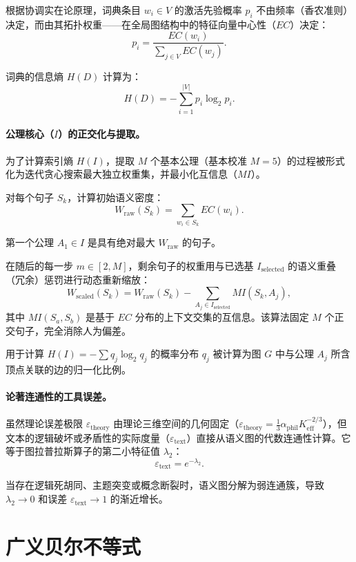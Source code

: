 \documentclass[11pt,a4paper]{article}
\begin{document}
	根据协调实在论原理，词典条目 \(w_i \in V\) 的激活先验概率 \(p_i\) 不由频率（香农准则）决定，而由其拓扑权重——在全局图结构中的特征向量中心性（\(EC\)）决定：
	\[
	p_{i} = \frac{EC(w_{i})}{\sum_{j \in V} EC(w_{j})}.
	\]
	
	词典的信息熵 \(H(D)\) 计算为：
	\[
	H(D) = -\sum_{i=1}^{|V|} p_{i} \log_{2} p_{i}.
	\]
	
	\paragraph{公理核心（\(I\)）的正交化与提取。}
	为了计算索引熵 \(H(I)\)，提取 \(M\) 个基本公理（基本校准 \(M = 5\)）的过程被形式化为迭代贪心搜索最大独立权重集，并最小化互信息（\(MI\)）。
	
	对每个句子 \(S_{k}\)，计算初始语义密度：
	\[
	W_{\text{raw}}(S_k) = \sum_{w_i \in S_k} EC(w_i).
	\]
	
	第一个公理 \(A_1 \in I\) 是具有绝对最大 \(W_{\text{raw}}\) 的句子。
	
	在随后的每一步 \(m \in [2, M]\)，剩余句子的权重用与已选基 \(I_{\text{selected}}\) 的语义重叠（冗余）惩罚进行动态重新缩放：
	\[
	W_{\text{scaled}}(S_{k}) = W_{\text{raw}}(S_{k}) - \sum_{A_{j} \in I_{\text{selected}}} MI(S_{k}, A_{j}),
	\]
	其中 \(MI(S_a, S_b)\) 是基于 \(EC\) 分布的上下文交集的互信息。该算法固定 \(M\) 个正交句子，完全消除人为偏差。
	
	用于计算 \(H(I) = -\sum q_j \log_2 q_j\) 的概率分布 \(q_{j}\) 被计算为图 \(G\) 中与公理 \(A_{j}\) 所含顶点关联的边的归一化比例。
	
	\paragraph{论著连通性的工具误差。}
	虽然理论误差极限 \(\varepsilon_{\text{theory}}\) 由理论三维空间的几何固定（\(\varepsilon_{\text{theory}} = \frac{1}{3} \alpha_{\text{phil}} K_{\text{eff}}^{-2/3}\)），但文本的逻辑破坏或矛盾性的实际度量（\(\varepsilon_{\text{text}}\)）直接从语义图的代数连通性计算。它等于图拉普拉斯算子的第二小特征值 \(\lambda_{2}\)：
	\[
	\varepsilon_{\text{text}} = e^{-\lambda_{2}}.
	\]
	
	当存在逻辑死胡同、主题突变或概念断裂时，语义图分解为弱连通簇，导致 \(\lambda_2 \to 0\) 和误差 \(\varepsilon_{\text{text}} \to 1\) 的渐近增长。
	
	\section{广义贝尔不等式}
	
\end{document}
